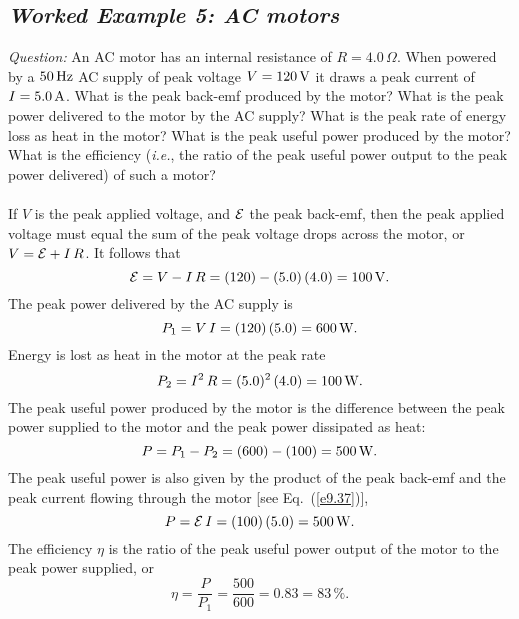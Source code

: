 \subsection*{\em Worked Example 5: AC motors}
{\em Question:} An AC motor has an internal resistance of $R=4.0\,\Omega$. When
powered by a $50\,{\rm Hz}$ AC supply of peak voltage $V=120\,{\rm V}$ it draws a peak current of
$I=5.0\,{\rm A}$. What is the peak back-emf produced by the motor? What  is the peak power
delivered to the motor by the AC supply? What is the peak rate of energy loss as heat in the 
motor? What is the peak useful power  produced by the motor? What is the efficiency
({\em i.e.}, the ratio of the peak useful power output to the peak power delivered)
of such a motor?\\
~\\
 If $V$ is the peak applied voltage, and ${\cal E}$ 
the peak back-emf, then the peak applied voltage must equal the sum of the peak voltage
drops across the motor, or $V = {\cal E} + I\,R$. It follows that
$$
{\cal E} = V - I\,R = (120) - (5.0)\,(4.0) = 100\,{\rm V}.
$$
The peak power delivered by the AC supply is
$$
P_1 = V\,I = (120)\,(5.0) = 600\,{\rm W}.
$$
Energy is lost as heat in the motor at the peak rate
$$
P_2 = I^2\,R = (5.0)^2\,(4.0) = 100\,{\rm W}.
$$
The peak useful power produced by the motor is the difference between the
peak power supplied to the motor and the peak power dissipated as heat:
$$
P = P_1 - P_2 = (600) - (100) = 500\,{\rm W}.
$$
The peak useful power is also given by the product of the peak back-emf and
the peak current flowing through the motor [see Eq.~(\ref{e9.37})],
$$
P= {\cal E}\,I = (100)\,(5.0) = 500\,{\rm W}.
$$
The efficiency $\eta$ is the ratio of the peak useful power output of the motor
to the peak  power supplied, or
$$
\eta = \frac{P}{P_1} = \frac{500}{600} = 0.83 = 83\,\%.
$$
